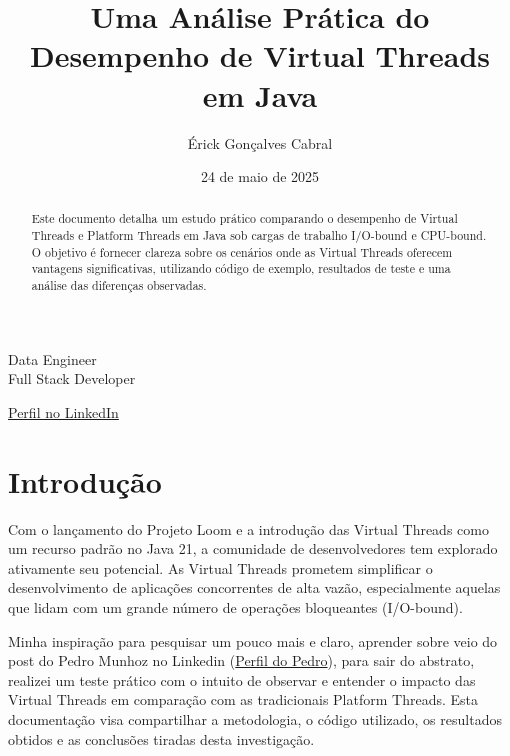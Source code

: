\documentclass[12pt,a4paper]{article}
\title{\large Uma Análise Prática do Desempenho de Virtual Threads em Java}
\author{Érick Gonçalves Cabral} \\
\date{24 de maio de 2025}
\newcommand{\linkedinErickCabral}{https://www.linkedin.com/in/erick-cabralgca}
\newcommand{\linkedinPedroMunhoz}{https://www.linkedin.com/in/pedro-munhoz-675847222}
\begin{document}
\makeatletter 
\begin{titlepage}
    \centering 
    \vspace*{2.0cm} 
    {\Large \@author \par} 
    \vspace{0.4cm} 
    {\normalsize Data Engineer \\
    Full Stack Developer \par}
    \vfill 

    {\Huge \bfseries \@title \par} 

    \vfill 
    {\large \href{\linkedinErickCabral}{Perfil no LinkedIn} \par} 
    
    \vspace{0.5cm} 
    {\large \@date \par} 
    \vspace*{2cm} 

    \thispagestyle{empty} 
\end{titlepage}
\makeatother 

\begin{abstract}
Este documento detalha um estudo prático comparando o desempenho de Virtual Threads e Platform Threads em Java sob cargas de trabalho I/O-bound e CPU-bound. O objetivo é fornecer clareza sobre os cenários onde as Virtual Threads oferecem vantagens significativas, utilizando código de exemplo, resultados de teste e uma análise das diferenças observadas.
\end{abstract}
\clearpage 
\tableofcontents
\clearpage

\section{Introdução}
Com o lançamento do Projeto Loom e a introdução das Virtual Threads como um recurso padrão no Java 21, a comunidade de desenvolvedores tem explorado ativamente seu potencial. As Virtual Threads prometem simplificar o desenvolvimento de aplicações concorrentes de alta vazão, especialmente aquelas que lidam com um grande número de operações bloqueantes (I/O-bound).

Minha inspiração para pesquisar um pouco mais e claro, aprender sobre veio do post do Pedro Munhoz no Linkedin (\href{\linkedinPedroMunhoz}{Perfil do Pedro}), para sair do abstrato, realizei um teste prático com o intuito de observar e entender o impacto das Virtual Threads em comparação com as tradicionais Platform Threads. Esta documentação visa compartilhar a metodologia, o código utilizado, os resultados obtidos e as conclusões tiradas desta investigação.
\end{document}
